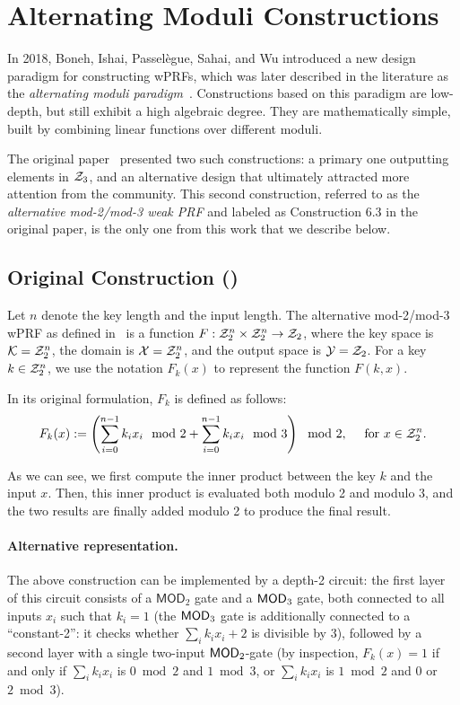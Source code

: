 
\section{Alternating Moduli Constructions}
\label{sec:bipsw}


In 2018, Boneh, Ishai, Passelègue, Sahai, and Wu introduced a new design paradigm for constructing wPRFs, which was later described in the literature as the \emph{alternating moduli paradigm}~\cite{TCC:BIPSW18}. Constructions based on this paradigm are low-depth, but still exhibit a high algebraic degree. They are mathematically simple, built by combining linear functions over different moduli.

The original paper~\cite{TCC:BIPSW18} presented two such constructions: a primary one outputting elements in $\mathcal{Z}_3$, and an alternative design that ultimately attracted more attention from the community. This second construction, referred to as the \emph{alternative mod-2/mod-3 weak PRF} and labeled as Construction 6.3 in the original paper, is the only one from this work that we describe below. 


\subsection{Original Construction (\cite{TCC:BIPSW18})}
\label{sec:bipsw_original}
Let $n$ denote the key length and the input length. 
The alternative mod-2/mod-3 wPRF as defined in~\cite{TCC:BIPSW18} is a function $F : \mathcal{Z}_2^n \times \mathcal{Z}_2^n \to \mathcal{Z}_2$, where the key space is $\mathcal{K} = \mathcal{Z}_2^n$, the domain is $\mathcal{X} = \mathcal{Z}_2^n$, and the output space is $\mathcal{Y} = \mathcal{Z}_2$. For a key $k \in \mathcal{Z}_2^n$, we use the notation $F_k(x)$ to represent the function $F(k, x)$.

In its original formulation, $F_k$ is defined as follows:
    \begin{equation} \label{eq:bipsw_orig}
    F_k(x) := \left(\sum_{i = 0}^{n-1} k_i x_i \mod 2 + \sum_{i = 0}^{n-1} k_i x_i \mod 3\right) \mod{2}, \quad \text{ for } x \in \mathcal{Z}_2^n.  
    \end{equation}


As we can see, we first compute the inner product between the key $k$ and the input $x$. Then, this inner product is evaluated both modulo 2 and modulo 3, and the two results are finally added modulo 2 to produce the final result.  

\paragraph{Alternative representation.} The above construction can be implemented by a depth-2 circuit: 
the first layer of this circuit consists of a $\mathsf{MOD}_2$ gate and a $\mathsf{MOD}_3$ gate, both connected to all inputs $x_i$ such that $k_i = 1$ (the $\mathsf{MOD}_3$ gate is additionally connected to a ``constant-2'': it checks whether $\sum_i k_ix_i+2$ is divisible by $3$), followed by a second layer with a single two-input $\mathsf{MOD}_2$-gate (by inspection, $F_k(x) = 1$ if and only if $\sum_i k_ix_i$ is $0 \bmod 2$ and $1 \bmod 3$, or $\sum_i k_ix_i$ is $1 \bmod 2$ and 0 or $2 \bmod 3$).

